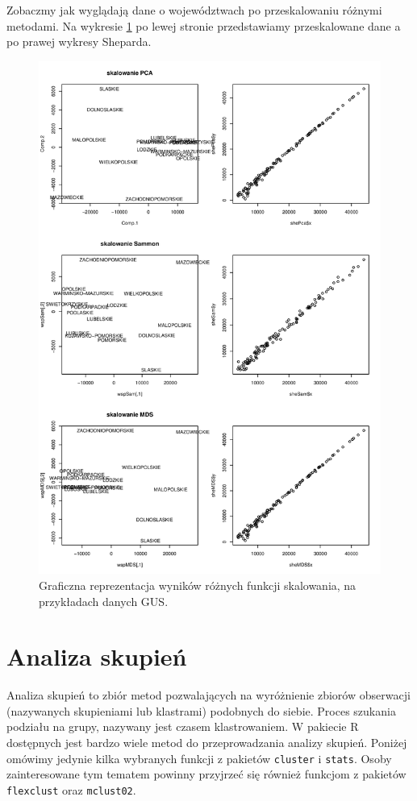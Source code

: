 \documentclass[polish,]{book}
\begin{document}
Zobaczmy jak wyglądają dane o województwach po przeskalowaniu różnymi metodami. Na wykresie \ref{fig:skal3} po lewej stronie przedstawiamy przeskalowane dane a po
prawej wykresy Sheparda.

\begin{figure}

{\centering \includegraphics[width=0.85\linewidth]{skalowanie3} 

}

\caption{Graficzna reprezentacja wyników różnych funkcji skalowania, na przykładach danych GUS.}\label{fig:skal3}
\end{figure}

\hypertarget{part_3}{%
\chapter{Analiza skupień}\label{part_3}}

Analiza skupień to zbiór metod pozwalających na wyróżnienie zbiorów obserwacji
(nazywanych skupieniami lub klastrami) podobnych do siebie. Proces szukania podziału na grupy, nazywany jest czasem klastrowaniem. W pakiecie R dostępnych
jest bardzo wiele metod do przeprowadzania analizy skupień. Poniżej omówimy jedynie kilka wybranych funkcji z pakietów \texttt{cluster} i \texttt{stats}. Osoby zainteresowane
tym tematem powinny przyjrzeć się również funkcjom z pakietów \texttt{flexclust} oraz
\texttt{mclust02}.
\end{document}
